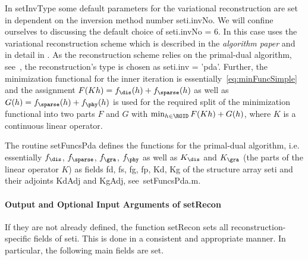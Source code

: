 \documentclass[a4paper]{article}
\begin{document}
In \textsf{setInvType} some default parameters for the variational reconstruction are set in dependent on the inversion method number \textsf{seti.invNo}. We will confine ourselves to discussing the default choice of \textsf{seti.invNo = 6}. In this case \IPscatt uses the variational reconstruction scheme which is described in the \emph{algorithm paper} and in detail in \cite[Sec.~4]{Buergel2017}. As the reconstruction scheme relies on the primal-dual algorithm, see~\cite{Chambolle2011}, the reconstruction's type is chosen as \textsf{seti.inv = 'pda'}. Further, the minimization functional for the inner iteration is essentially~\eqref{eq:minFuncSimple} and the assignment $F(Kh) = f_\dis(h) + f_\sparse(h)$ as well as $G(h) = f_\sparse(h) + f_\phy(h)$ is used for the required split of the minimization functional into two parts $F$ and $G$ with $\min_{h \in \ROID} F(Kh) + G(h)$, where $K$ is a continuous linear operator.

The routine \textsf{setFuncsPda} defines the functions for the primal-dual algorithm, i.e. essentially $f_\dis$, $f_\sparse$, $f_\gra$, $f_\phy$ as well as $K_\dis$ and $K_\gra$ (the parts of the linear operator $K$) as fields \textsf{fd}, \textsf{fs}, \textsf{fg}, \textsf{fp}, \textsf{Kd}, \textsf{Kg} of the structure array \textsf{seti} and their adjoints \textsf{KdAdj} and \textsf{KgAdj}, see~\textsf{setFuncsPda.m}.

\paragraph{Output and Optional Input Arguments of \textsf{setRecon}} If they are not already defined, the function \textsf{setRecon} sets all reconstruction-specific fields of \textsf{seti}. This is done in a consistent and appropriate manner. In particular, the following main fields are set.
\end{document}
